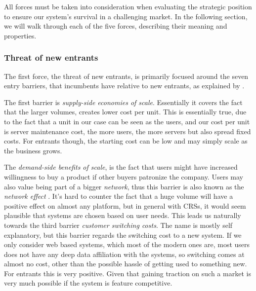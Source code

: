 All forces must be taken into consideration when evaluating the strategic position to ensure our system's survival in a challenging market.
In the following section, we will walk through each of the five forces, describing their meaning and properties.


\subsubsection*{Threat of new entrants}\label{sec:threat-of-new-entrants}
The first force, the threat of new entrants, is primarily focused around the seven entry barriers, that incumbents have relative to new entrants, as explained by .

The first barrier is \emph{supply-side economies of scale}. Essentially it covers the fact that the larger volumes, creates lower cost per unit. This is essentially true, due to the fact that a unit in our case can be seen as the users, and our cost per unit is server maintenance cost, the more users, the more servers but also spread fixed costs. For entrants though, the starting cost can be low and may simply scale as the business grows.

The \emph{demand-side benefits of scale}, is the fact that users might have increased willingness to buy a product if other buyers patronize the company. Users may also value being part of a bigger \emph{network}, thus this barrier is also known as the \emph{network effect} \cite[p.~81]{porter2008five}. It's hard to counter the fact that a huge volume will have a positive effect on almost any platform, but in general with CRSs, it would seem plausible that systems are chosen based on user needs. This leads us naturally towards the third barrier \emph{customer switching costs}. The name is mostly self explanatory, but this barrier regards the switching cost to a new system. If we only consider web based systems, which most of the modern ones are, most users does not have any deep data affiliation with the systems, so switching comes at almost no cost, other than the possible hassle of getting used to something new. For entrants this is very positive. Given that gaining traction on such a market is very much possible if the system is feature competitive.

